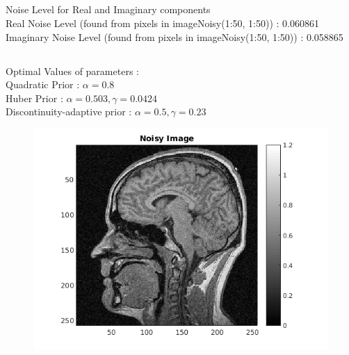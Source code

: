 \documentclass[11pt]{article}
\begin{document}
\maketitle

\subsection{}
Noise Level for Real and Imaginary components \\
Real Noise Level (found from pixels in imageNoisy(1:50, 1:50)) : 0.060861 \\
Imaginary Noise Level (found from pixels in imageNoisy(1:50, 1:50)) : 0.058865 


\subsection{}
Optimal Values of parameters : \\
Quadratic Prior : $\alpha = 0.8$ \\
Huber Prior : $\alpha = 0.503, \gamma = 0.0424$ \\
Discontinuity-adaptive prior : $\alpha = 0.5, \gamma = 0.23$

\begin{figure}[h]
\centering
\includegraphics[scale=0.7]{Noisy}
\end{figure}
\end{document}
